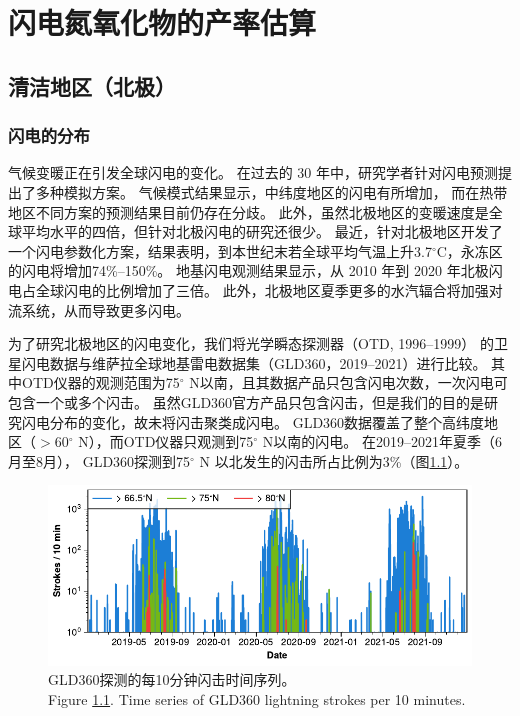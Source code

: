 
\chapter{闪电氮氧化物的产率估算} \label{chapter:PE}

\section{清洁地区（北极）}

\subsection{闪电的分布} \label{subsect:lightning_distribution}

气候变暖正在引发全球闪电的变化\citep{Reeve.1999,Williams.2005a,Price.2009a}。
在过去的 30 年中，研究学者针对闪电预测提出了多种模拟方案\citep{Price.1992,Price.1997b,Allen.2002,Futyan.2007,Finney.2014,Romps.2014}。
气候模式结果显示，中纬度地区的闪电有所增加\citep{Michalon.1999,Romps.2014,Luhar.2021}，
而在热带地区不同方案的预测结果目前仍存在分歧\citep{Finney.2018,Romps.2019}。
此外，虽然北极地区的变暖速度是全球平均水平的四倍\citep{Rantanen.2022}，但针对北极闪电的研究还很少。
最近，\citet{Chen.2021a}针对北极地区开发了一个闪电参数化方案，结果表明，到本世纪末若全球平均气温上升3.7$^{\circ}$C，永冻区的闪电将增加74\%--150\%。
地基闪电观测结果显示，从 2010 年到 2020 年北极闪电占全球闪电的比例增加了三倍\citep{Holzworth.2021}。
此外，北极地区夏季更多的水汽辐合将加强对流系统，从而导致更多闪电\citep{Bintanja.2020}。

为了研究北极地区的闪电变化，我们将光学瞬态探测器（OTD, 1996--1999）\citep{Christian.2003} 的卫星闪电数据与维萨拉全球地基雷电数据集（GLD360，2019--2021）进行比较。
其中OTD仪器的观测范围为75$^{\circ}$ N以南，且其数据产品只包含闪电次数，一次闪电可包含一个或多个闪击。
虽然GLD360官方产品只包含闪击，但是我们的目的是研究闪电分布的变化，故未将闪击聚类成闪电。
GLD360数据覆盖了整个高纬度地区（$>$60$^{\circ}$ N），而OTD仪器只观测到75$^{\circ}$ N以南的闪电。
在2019--2021年夏季（6月至8月）， GLD360探测到75$^{\circ}$ N 以北发生的闪击所占比例为3\%（图\ref{fig:gld360_tseries}）。

\begin{figure}[!htbp]
\centering
\includegraphics[width=12cm]{./figures/arctic_gld360_tseries.pdf}
\caption{
GLD360探测的每10分钟闪击时间序列。\\
Figure \ref{fig:gld360_tseries}. Time series of GLD360 lightning strokes per 10 minutes.
}
\label{fig:gld360_tseries}
\end{figure}



